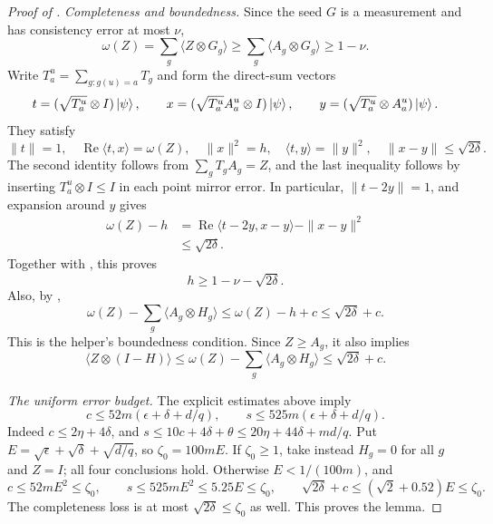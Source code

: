 \documentclass[11pt]{article}
\theoremstyle{definition}
\newcommand{\eps}{\epsilon}
\begin{document}
\begin{proof}[Proof of ]
\medskip\noindent\emph{Completeness and boundedness.}
Since the seed $G$ is a measurement and has consistency error at
most $\nu$,
\begin{equation}\label{eq:self-improvement-seed-certificate}
 \omega(Z)=\sum_g\langle Z\otimes G_g\rangle
 \geq\sum_g\langle A_g\otimes G_g\rangle\geq1-\nu.
\end{equation}
Write $T_a^u=\sum_{g:g(u)=a}T_g$ and form the direct-sum vectors
\[
 t=(\sqrt{T_a^u}\otimes I)\ket\psi,\qquad
 x=(\sqrt{T_a^u}A_a^u\otimes I)\ket\psi,\qquad
 y=(\sqrt{T_a^u}\otimes A_a^u)\ket\psi.
\]
They satisfy
\[
 \|t\|=1,\quad \operatorname{Re}\langle t,x\rangle=\omega(Z),
 \quad\|x\|^2=h,\quad\langle t,y\rangle=\|y\|^2,
 \quad\|x-y\|\leq\sqrt{2\delta}.
\]
The second identity follows from $\sum_gT_gA_g=Z$, and the last
inequality follows by inserting $T_a^u\otimes I\leq I$ in each
point mirror error.  In particular, $\|t-2y\|=1$, and expansion
around $y$ gives
\begin{align*}
 \omega(Z)-h
 &=\operatorname{Re}\langle t-2y,x-y\rangle-\|x-y\|^2\\
 &\leq\sqrt{2\delta}.
\end{align*}
Together with , this proves
\begin{equation}\label{eq:self-improvement-short-completeness}
 h\geq1-\nu-\sqrt{2\delta}.
\end{equation}
Also, by ,
\begin{equation}\label{eq:self-improvement-short-boundedness}
 \omega(Z)-\sum_g\langle A_g\otimes H_g\rangle
 \leq\omega(Z)-h+c\leq\sqrt{2\delta}+c.
\end{equation}
This is the helper's boundedness condition.  Since $Z\geq A_g$, it
also implies
\[
 \langle Z\otimes(I-H)\rangle
 \leq\omega(Z)-\sum_g\langle A_g\otimes H_g\rangle
 \leq\sqrt{2\delta}+c.
\]

\medskip\noindent\emph{The uniform error budget.}
The explicit estimates above imply
\[
 c\leq52m(\eps+\delta+d/q),\qquad
 s\leq525m(\eps+\delta+d/q).
\]
Indeed $c\leq2\eta+4\delta$, and
$s\leq10c+4\delta+\theta\leq20\eta+44\delta+md/q$.
Put $E=\sqrt\eps+\sqrt\delta+\sqrt{d/q}$, so
$\zeta_0=100mE$.  If $\zeta_0\geq1$, take instead $H_g=0$ for all
$g$ and $Z=I$; all four conclusions hold.  Otherwise
$E<1/(100m)$, and
\[
 c\leq52mE^2\leq\zeta_0,\qquad
 s\leq525mE^2\leq5.25E\leq\zeta_0,
 \qquad
 \sqrt{2\delta}+c\leq(\sqrt2+0.52)E\leq\zeta_0.
\]
The completeness loss is at most $\sqrt{2\delta}\leq\zeta_0$ as
well.  This proves the lemma.
\end{proof}
\end{document}
